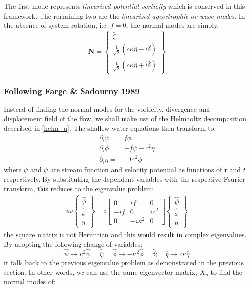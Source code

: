 The first mode represents \emph{linearised potential vorticity} which is 
conserved in this framework. The remaining two are the \emph{linearised 
ageostrophic or wave modes}. In the absence of system rotation, i.e. $f=0$, 
the normal modes are simply,
\begin{equation}
\label{nmode}
 \mathbf{N} = 
 \begin{Bmatrix}
  \hat \zeta \\
  \frac{1}{\sqrt{2}} (c\kappa \hat{\eta} - i\hat{\delta})\\
  \frac{1}{\sqrt{2}} (c\kappa \hat{\eta} + i\hat{\delta})
 \end{Bmatrix}
\end{equation}

\subsubsection{Following Farge \& Sadourny 1989}
Instead of finding the normal modes for the vorticity, divergence and 
displacement field of the flow, we shall make use of the Helmholtz 
decomposition described in \eqref{helm_u}. The shallow water equations then 
transform to:
 \begin{align}
    \partial_t \psi =&  f \phi
  \label{dtpsi_l} \\ 
    \partial_t \phi =&  -f \psi - c^2 \eta \label{dtphi_l} \\
    \partial_t \eta =& - \nabla^2 \phi \label{dteta_l2}
  \end{align}
where $\psi$ and $\psi$ are stream function and velocity potential as functions 
of $\mathbf{r}$ and $t$ respectively. By substituting the dependent 
variables with the respective Fourier transform, this reduces to the eigenvalue 
problem:
\begin{align}
 i\omega
   \begin{Bmatrix}
       \hat{\psi} \\ \hat{\phi} \\ \hat{\eta}
  \end{Bmatrix}
  = i
  \begin{bmatrix}
     0 & if & 0 \\
   -if &  0 & ic^2 \\
     0 & -i\kappa^2 & 0 
  \end{bmatrix}
  \begin{Bmatrix}
       \hat{\psi} \\ \hat{\phi} \\ \hat{\eta}
  \end{Bmatrix}
\end{align}
the square matrix is not Hermitian and this would result in complex 
eigenvalues. By adopting the following change of variables:
\begin{equation}
 \hat{\psi} \to \kappa^2\hat \psi = \hat{\zeta} ; \quad
 \hat{\phi} \to -\kappa^2\hat \phi = \hat{\delta}; \quad
 \hat{\eta} \to c\kappa\hat \eta
\end{equation}
it falls back to the previous eigenvalue problem as demonstrated in the  
previous section. In other words, we can use the same eigenvector matrix, $X_n$ 
to find the normal modes of:

